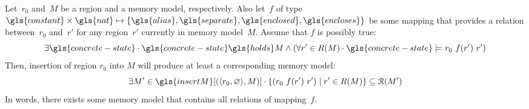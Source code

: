 \begin{lemma}\label{lem:insert}
  Let~$r_0$ and~$M$ be a region and a memory model, respectively.
  Also let~$f$ of type $\gls{constant}\times\gls{nat}\mapsto \{ \gls{alias},  \gls{separate}, \gls{enclosed},\gls{encloses}\}$ be some mapping that provides a relation between~$r_0$ and~$r'$ for any region~$r'$ currently in memory model~$M$.
  Assume that $f$ is possibly true:
  \begin{equation*}
    \exists\gls{concrete-state} \sepdot \gls{concrete-state} \gls{holds}M \land (\forall r' \in R(M) \sepdot \gls{concrete-state} \models r_0~f(r')~r')
  \end{equation*}
  Then, insertion of region $r_0$ into $M$ will produce at least a corresponding memory model:
  \begin{equation*}
    \exists M' \in \gls{insertM}[(\langle r_0,\varnothing\rangle,M)] \sepdot \{ (r_0~f(r')~r') \mid r' \in R(M) \} \subseteq \mathcal{R}(M')
  \end{equation*}
  In words, there exists some memory model that contains all relations of mapping~$f$.
\end{lemma}
